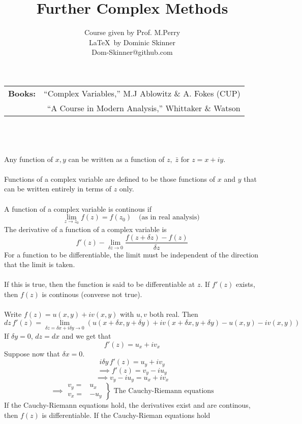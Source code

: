 \documentclass{article}
\begin{document}
\title{Further Complex Methods}
\author{Course given by Prof. M.Perry \\
\LaTeX\  by Dominic Skinner \\
Dom-Skinner@github.com}
\maketitle
\begin{tabular}{lr}
\textbf{Books:} & ``Complex Variables,'' M.J Ablowitz \& A. Fokes (CUP)\\
& ``A Course in Modern Analysis,'' Whittaker \& Watson
\end{tabular}
\\
\\
\\
Any function of $x,y$ can be written as a function of $z , \;\bar{z}$ for
$z = x+iy$.
\\
\\
Functions of a complex variable are defined to be those functions of $x$ and
$y$ that can be written entirely in terms of $z$ only.
\\
\\
A function of a complex variable is continous if
\[ \lim_{z \to z_0} f(z) = f(z_0) \quad \mbox{(as in real analysis) } \]
The derivative of a function of a complex variable is
\[ f'(z) - \lim_{\delta z \to 0} \frac{f(z+ \delta z) - f(z)}{\delta z} \]
For a function to be differentiable, the limit must be independent of
the direction that the limit is taken.
\\
\\
If this is true, then the function is said to be differentiable at $z$.
If $f'(z)$ exists, then $f(z)$ is continous (converse not true).
\\
\\
Write $f(z) = u(x,y) + iv(x,y)$ with $u,v$ both real. Then
\[ dz \, f'(z) = \lim_{\delta z = \delta x + i \delta y \to 0} \left(
u(x+\delta x, y+ \delta y) + iv(x+\delta x,y+\delta y) - u(x,y) - iv(x,y) 
\right) \]
If $\delta y = 0$, $dz = dx$ and we get that
\[ f'(z) = u_x + i v_x \]
Suppose now that $\delta x = 0$.
\[ i \delta y\, f'(z) = u_y+iv_y \]
\[ \implies f'(z) = v_y - i u_y \]
\[ \implies v_y - iu_y = u_x + iv_x \]
\[ \implies \left. \begin{array}{cr}
v_y =& u_x \\
v_x =& -u_y \end{array} \right\} \mbox{ The Cauchy-Riemann equations} \]
If the Cauchy-Riemann equations hold, the derivatives exist and are 
continous, then $f(z)$ is differentiable. If the Cauchy-Rieman equations hold
\end{document}
